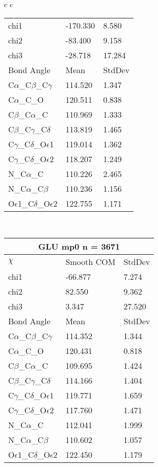 \begin{longtable}{ c c }
\begin{tabular}{ l l l }
  chi1 & -170.330 & 8.580 \\ 
  chi2 & -83.400 & 9.158 \\ 
  chi3 & -28.718 & 17.284 \\ \midrule
  Bond Angle   & Mean     & StdDev \\ \midrule
  C$\alpha$\_C$\beta$\_C$\gamma$ & 114.520 & 1.347\\
  C$\alpha$\_C\_O & 120.511 & 0.838\\
  C$\beta$\_C$\alpha$\_C & 110.969 & 1.333\\
  C$\beta$\_C$\gamma$\_C$\delta$ & 113.819 & 1.465\\
  C$\gamma$\_C$\delta$\_O$\epsilon$1 & 119.014 & 1.362\\
  C$\gamma$\_C$\delta$\_O$\epsilon$2 & 118.207 & 1.249\\
  N\_C$\alpha$\_C & 110.226 & 2.465\\
  N\_C$\alpha$\_C$\beta$ & 110.236 & 1.156\\
  O$\epsilon$1\_C$\delta$\_O$\epsilon$2 & 122.755 & 1.171\\
  \bottomrule
  \end{tabular}
  \\
  \begin{tabular}{ l l l }
  \toprule
  \multicolumn{3}{c}{GLU \textbf{mp0} n = 3671} \\ \toprule
  $\chi$       & Smooth COM & StdDev \\ \midrule
  chi1 & -66.877 & 7.274 \\ 
  chi2 & 82.550 & 9.362 \\ 
  chi3 & 3.347 & 27.520 \\ \midrule
  Bond Angle   & Mean     & StdDev \\ \midrule
  C$\alpha$\_C$\beta$\_C$\gamma$ & 114.352 & 1.344\\
  C$\alpha$\_C\_O & 120.431 & 0.818\\
  C$\beta$\_C$\alpha$\_C & 109.695 & 1.424\\
  C$\beta$\_C$\gamma$\_C$\delta$ & 114.166 & 1.404\\
  C$\gamma$\_C$\delta$\_O$\epsilon$1 & 119.771 & 1.659\\
  C$\gamma$\_C$\delta$\_O$\epsilon$2 & 117.760 & 1.471\\
  N\_C$\alpha$\_C & 112.041 & 1.999\\
  N\_C$\alpha$\_C$\beta$ & 110.602 & 1.057\\
  O$\epsilon$1\_C$\delta$\_O$\epsilon$2 & 122.450 & 1.179\\
  \bottomrule

\end{tabular}
\end{longtable}
